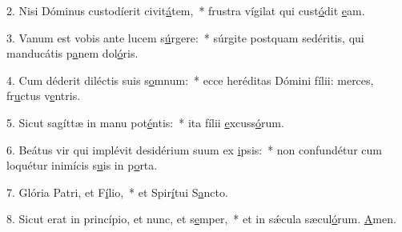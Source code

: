 2. Nisi Dóminus custodíerit civit\uline{á}tem,~* frustra vígilat qui cust\uline{ó}dit \uline{e}am.\par 
3. Vanum est vobis ante lucem s\uline{ú}rgere:~* súrgite postquam sedéritis, qui manducátis p\uline{a}nem dol\uline{ó}ris.\par 
4. Cum déderit diléctis suis s\uline{o}mnum:~* ecce heréditas Dómini fílii: merces, fr\uline{u}ctus v\uline{e}ntris.\par 
5. Sicut sagíttæ in manu pot\uline{é}ntis:~* ita fílii \uline{e}xcuss\uline{ó}rum.\par 
6. Beátus vir qui implévit desidérium suum ex \uline{i}psis:~* non confundétur cum loquétur inimícis s\uline{u}is in p\uline{o}rta.\par 
7. Glória Patri, et F\uline{í}lio,~* et Spir\uline{í}tui S\uline{a}ncto.\par 
8. Sicut erat in princípio, et nunc, et s\uline{e}mper,~* et in sǽcula sæcul\uline{ó}rum. \uline{A}men.\par 
